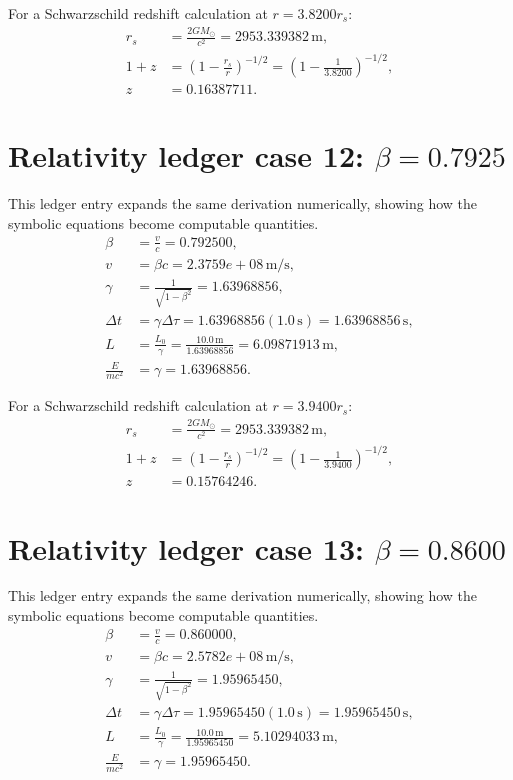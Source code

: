 \documentclass[11pt,a4paper]{article}
\begin{document}
For a Schwarzschild redshift calculation at $r=3.8200r_s$:
\begin{align}
r_s &= \frac{2GM_\odot}{c^2}=2953.339382\,\mathrm{m},\\
1+z &= \left(1-\frac{r_s}{r}\right)^{-1/2}
=\left(1-\frac{1}{3.8200}\right)^{-1/2},\\
z&=0.16387711.
\end{align}

\section{Relativity ledger case 12: $\beta=0.7925$}
This ledger entry expands the same derivation numerically, showing how the symbolic equations become computable quantities.
\begin{align}
\beta &= \frac{v}{c}=0.792500,\\
v &= \beta c = 2.3759e+08\,\mathrm{m/s},\\
\gamma &= \frac{1}{\sqrt{1-\beta^2}} = 1.63968856,\\
\Delta t &= \gamma\Delta\tau = 1.63968856(1.0\,\mathrm{s}) = 1.63968856\,\mathrm{s},\\
L &= \frac{L_0}{\gamma} = \frac{10.0\,\mathrm{m}}{1.63968856} = 6.09871913\,\mathrm{m},\\
\frac{E}{mc^2}&=\gamma=1.63968856.
\end{align}

For a Schwarzschild redshift calculation at $r=3.9400r_s$:
\begin{align}
r_s &= \frac{2GM_\odot}{c^2}=2953.339382\,\mathrm{m},\\
1+z &= \left(1-\frac{r_s}{r}\right)^{-1/2}
=\left(1-\frac{1}{3.9400}\right)^{-1/2},\\
z&=0.15764246.
\end{align}

\newpage

\section{Relativity ledger case 13: $\beta=0.8600$}
This ledger entry expands the same derivation numerically, showing how the symbolic equations become computable quantities.
\begin{align}
\beta &= \frac{v}{c}=0.860000,\\
v &= \beta c = 2.5782e+08\,\mathrm{m/s},\\
\gamma &= \frac{1}{\sqrt{1-\beta^2}} = 1.95965450,\\
\Delta t &= \gamma\Delta\tau = 1.95965450(1.0\,\mathrm{s}) = 1.95965450\,\mathrm{s},\\
L &= \frac{L_0}{\gamma} = \frac{10.0\,\mathrm{m}}{1.95965450} = 5.10294033\,\mathrm{m},\\
\frac{E}{mc^2}&=\gamma=1.95965450.
\end{align}
\end{document}
